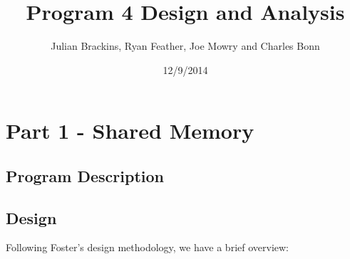 \documentclass{article}
\begin{document}
\title{Program 4 Design and Analysis}
\author{Julian Brackins, Ryan Feather, Joe Mowry and Charles Bonn}
\date{12/9/2014}
\maketitle

\section{Part 1 - Shared Memory}

\subsection{Program Description}

\subsection{Design}
Following Foster's design methodology, we have a brief overview:
\end{document}
